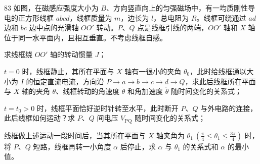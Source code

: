 \begin{problem}[第34届物理决赛][磁场中的正方形线框]{83}
    如图，在磁感应强度大小为 $B$、方向竖直向上的匀强磁场中，有一均质刚性导电的正方形线框 $abcd$，线框质量为 $m$，边长为 $l$，总电阻为 $R$。线框可绕通过 $ad$ 边和 $bc$ 边中点的光滑轴 $OO'$ 转动。$P$、$Q$ 点是线框引线的两端，$OO'$ 轴和 $X$ 轴位于同一水平面内，且相互垂直。不考虑线框自感。
    \begin{subproblem}
        \begin{subsubproblem}
            求线框绕 $OO'$ 轴的转动惯量 $J$；
        \end{subsubproblem}
        \begin{subsubproblem}
            $t=0$ 时，线框静止，其所在平面与 $X$ 轴有一很小的夹角 $\theta_0$，此时给线框通以大小为 $I$ 的恒定直流电流，方向沿 $P\rightarrow a\rightarrow b\rightarrow c\rightarrow d\rightarrow Q$，求此后线框所在平面与 $X$ 轴的夹角 $\theta$、线框转动的角速度 $\dot{\theta}$ 和角加速度 $\ddot{\theta}$ 随时间变化的关系式；
        \end{subsubproblem}
        \begin{subsubproblem}
            $t=t_0>0$ 时，线框平面恰好逆时针转至水平，此时断开 $P$、$Q$ 与外电路的连接，此后线框如何运动？求 $P$、$Q$ 间电压 $V_{\mathrm{PQ}}$ 随时间变化的关系式；
        \end{subsubproblem}
        \begin{subsubproblem}
            线框做上述运动一段时间后，当其所在平面与 $X$ 轴夹角为 $\theta_{1}\ (\frac{\pi}{4}\leq\theta_{1}\leq\frac{3\pi}{4})$ 时，将 $P$、$Q$ 短路，线框再转一小角度 $\alpha$ 后停止，求 $\alpha$ 与 $\theta_{1}$ 的关系式和 $\alpha$ 的最小值。
        \end{subsubproblem}
    \end{subproblem}
\end{problem}